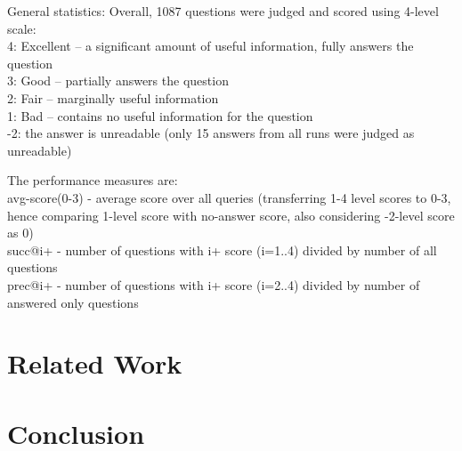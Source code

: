 \documentclass[]{article}
\begin{document}
General statistics:
Overall, 1087 questions were judged and scored using 4-level scale:\\
4: Excellent -- a significant amount of useful information, fully answers the question\\
3: Good – partially answers the question\\
2: Fair -- marginally useful information\\
1: Bad – contains no useful information for the question\\
-2: the answer is unreadable  (only 15 answers from all runs were judged as unreadable)

The performance measures are:\\
avg-score(0-3) - average score over all queries (transferring 1-4 level scores to 0-3, hence comparing 1-level score with no-answer score, also considering -2-level score as 0)\\
succ@i+ - number of questions with i+ score (i=1..4) divided by number of all questions\\
prec@i+ - number of questions with i+ score (i=2..4) divided by number of answered only questions\\

\section{Related Work}

\section{Conclusion}



\end{document}
